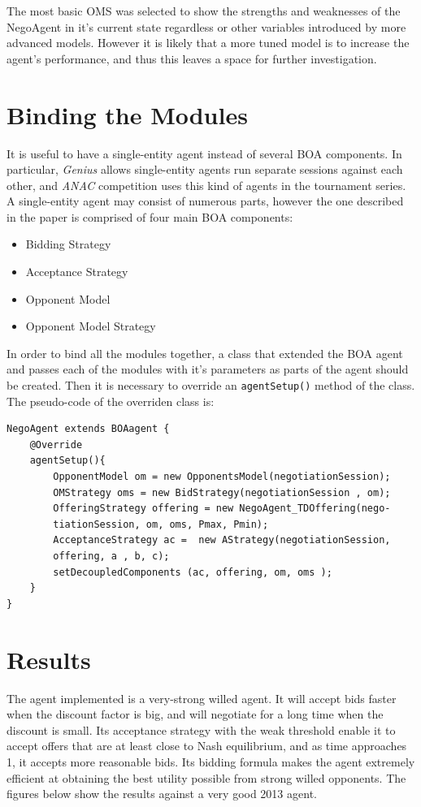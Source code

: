 \documentclass[html]{report}    %
\begin{document}
The most basic OMS was selected to show the strengths and weaknesses of the NegoAgent in it's current state regardless or other variables introduced by more advanced models. However it is likely that a more tuned model is to increase the agent's performance, and thus this leaves a space for further investigation.

\section{Binding the Modules}

It is useful to have a single-entity agent instead of several BOA components. In particular, \textit{Genius} allows single-entity agents run separate sessions against each other, and \textit{ANAC} competition uses this kind of agents in the tournament series. A single-entity agent may consist of numerous parts, however the one described in the paper is comprised of four main BOA components:
\begin{itemize}
	\item Bidding Strategy
	\item Acceptance Strategy
	\item Opponent Model
	\item Opponent Model Strategy
\end{itemize}

In order to bind all the modules together, a class that extended the BOA agent and passes each of the modules with it's parameters as parts of the agent should be created. Then it is necessary to override an \texttt{agentSetup()} method of the class. The pseudo-code of the overriden class is:

\begin{verbatim}
NegoAgent extends BOAagent {    
    @Override
    agentSetup(){
        OpponentModel om = new OpponentsModel(negotiationSession);
        OMStrategy oms = new BidStrategy(negotiationSession , om);
        OfferingStrategy offering = new NegoAgent_TDOffering(nego-
        tiationSession, om, oms, Pmax, Pmin);
        AcceptanceStrategy ac =  new AStrategy(negotiationSession,
        offering, a , b, c);
        setDecoupledComponents (ac, offering, om, oms );
    }
}
\end{verbatim}

\section{Results}

The agent implemented is a very-strong willed agent. It will accept bids faster when the discount factor is big, and will negotiate for a long time when the discount is small. Its acceptance strategy with the weak threshold enable it to accept offers that are at least close to Nash equilibrium, and as time approaches 1, it accepts more reasonable bids. Its bidding formula makes the agent extremely efficient at obtaining the best utility possible from strong willed opponents. The figures below show the results against a very good 2013 agent.
\end{document}
